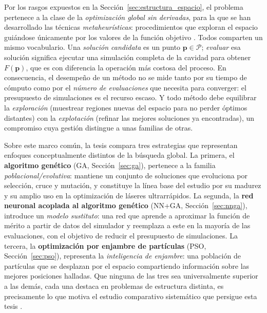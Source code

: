 Por los rasgos expuestos en la Sección~\ref{sec:estructura_espacio}, el problema
pertenece a la clase de la \emph{optimización global sin derivadas}, para la que se
han desarrollado las técnicas \emph{metaheurísticas}: procedimientos que exploran el
espacio guiándose únicamente por los valores de la función objetivo
\cite{BruntonKutz2022}. Todos comparten un mismo
vocabulario. Una \emph{solución candidata} es un punto $\mathbf{p}\in\mathcal{P}$;
\emph{evaluar} esa solución significa ejecutar una simulación completa de la cavidad
para obtener $F(\mathbf{p})$, que es con diferencia la operación más costosa del
proceso. En consecuencia, el desempeño de un método no se mide tanto por su tiempo
de cómputo como por el \emph{número de evaluaciones} que necesita para converger:
el presupuesto de simulaciones es el recurso escaso. Y todo método debe equilibrar
la \emph{exploración} (muestrear regiones nuevas del espacio para no perder óptimos
distantes) con la \emph{explotación} (refinar las mejores soluciones ya
encontradas), un compromiso cuya gestión distingue a unas familias de otras.

Sobre este marco común, la tesis compara tres estrategias que representan enfoques
conceptualmente distintos de la búsqueda global. La primera, el \textbf{algoritmo
genético} (GA, Sección~\ref{sec:ga}), pertenece a la familia
\emph{poblacional\-/evolutiva}: mantiene un conjunto de soluciones que evoluciona
por selección, cruce y mutación, y constituye la línea base del estudio por su
madurez y su amplio uso en la optimización de láseres ultrarrápidos. La segunda, la
\textbf{red neuronal acoplada al algoritmo genético} (NN+GA,
Sección~\ref{sec:nnga}), introduce un \emph{modelo sustituto}: una red que aprende a
aproximar la función de mérito a partir de datos del simulador y reemplaza a este en
la mayoría de las evaluaciones, con el objetivo de reducir el presupuesto de
simulaciones. La tercera, la \textbf{optimización por enjambre de partículas} (PSO,
Sección~\ref{sec:pso}), representa la \emph{inteligencia de enjambre}: una población
de partículas que se desplazan por el espacio compartiendo información sobre las
mejores posiciones halladas. Que ninguna de las tres sea universalmente superior a
las demás, cada una destaca en problemas de estructura distinta, es precisamente lo
que motiva el estudio comparativo sistemático que persigue esta tesis
\cite{Genty2021}.



